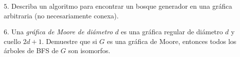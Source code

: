 \documentclass{article}
\begin{document}
\begin{enumerate}
\begin{proof}
\begin{itemize}
        Esto implica que $B_{C}(C)$ no es un árbol, ya que un árbol es conexo y acíclico.

        Por lo tanto, $c_{1}$ y $c_{2}$ no pueden ser adyacentes.
    \end{itemize}
  \end{proof}

\item[$5$.] Describa un algoritmo para encontrar un bosque generador en una
  gr\'afica arbitraria (no necesariamente conexa).

\item[$6$.] Una {\em gr\'afica de Moore de di\'ametro $d$} es una gr\'afica
  regular de di\'ametro $d$ y cuello $2d+1$.   Demuestre que si $G$ es
  una gr\'afica de Moore, entonces todos los \'arboles de BFS de $G$
  son isomorfos.

\end{enumerate}
\end{document}
